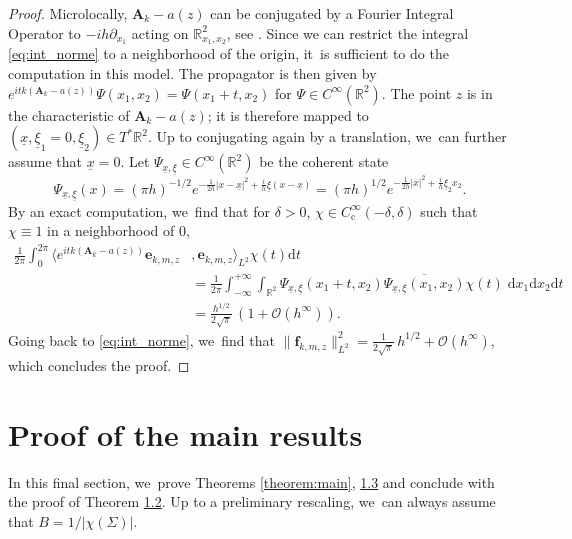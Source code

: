 \documentclass[10pt,a4paper]{amsart}
\newcommand{\bA}{\boldsymbol{A}}
\newcommand{\bme}{\boldsymbol{e}}
\newcommand{\bmf}{\boldsymbol{f}}
\theoremstyle{plain}
\theoremstyle{definition}
\let\con\overline
\let\mc\mathcal
\newcommand{\R}{\mathbb{R}}
\newcommand{\dd}{\mathrm{d}}
\DeclareMathOperator{\comp}{c}
\newcommand{\bigo}{\mathcal{O}}
\begin{document}
\begin{proof}
Microlocally, $\bA_k-a(z)$ can be conjugated by a
Fourier Integral Operator to $-ih\partial_{x_1}$ acting on
$\R^2_{x_1, x_2}$, see \cite[Th.\,12.3]{Zworski-12}. Since we can restrict the integral \eqref{eq:int_norme} to a
neighborhood of the origin, it~is sufficient to do the computation in this
model. The propagator is then given by $e^{itk(\bA_k-a(z))} \Psi (x_1, x_2) = \Psi (x_1 +t, x_2)$ for $\Psi \in C^\infty(\R^2)$. The point $z$ is in the characteristic of $\bA_k-a(z)$; it is therefore mapped to \hbox{$(\underline{x}, \underline{\xi}_1=0,\underline{\xi}_2) \in T^*\R^2$}. Up to conjugating again by a translation, we~can further assume that $\underline{x}=0$. Let
$\Psi_{\underline{x}, \underline{\xi}} \in C^\infty (\R^2)$ be
the coherent state
\[
\Psi_{\underline{x}, \underline{\xi}} (x) = (\pi h)^{-1/2} e^{ -
\frac{1}{2h} | x - \underline{x}|^2 + \frac{i}{h} \underline{\xi} (x - \underline{x}) } = (\pi h)^{1/2}e^{ -
\frac{1}{2h} | x|^2 + \frac{i}{h} \underline{\xi}_2 x_2 }.\]
By an exact computation, we~find that for $\delta > 0$, $\chi \in C^\infty_{{\comp}}(-\delta,\delta)$ such that $\chi \equiv 1$ in a neighborhood of $0$,
\[
\begin{split} \frac{1}{2 \pi } \int_0^{2 \pi } \langle e^{itk(\bA_k-a(z))} \bme_{k,m,z}&,\bme_{k,m,z} \rangle_{L^2} \chi(t)  \dd t \\
& = \frac{1}{2\pi} \int_{-\infty}^{+\infty} \int_{\R^2} \Psi _{ \underline{x},
\underline{\xi} } (x_1 + t, x_2) \con { \Psi_{ \underline{x}, \underline{\xi} } (x_1,
x_2)} \chi(t) \; \dd x_1 \dd x_2 \dd t \\
& = \frac{ h^{1/2}}{2 \sqrt \pi }\,(1+ \mc{O}(h^\infty)).
\end{split}
\]
Going back to \eqref{eq:int_norme}, we~find that $ \|\bmf_{k,m,z}\|^2_{L^2} =
\tfrac{1}{ 2 \sqrt \pi}\, h^{1/2} + \bigo (h^{\infty})$, which
concludes the proof.
\end{proof}

\section{Proof of the main results}

\label{section:proofs}

In this final section, we~prove Theorems \ref{theorem:main}, \href{https://jep.centre-mersenne.org/item/10.5802/jep.333.pdf#page=6}{1.3} and conclude with the proof of Theorem \href{https://jep.centre-mersenne.org/item/10.5802/jep.333.pdf#page=5}{1.2}. Up to a preliminary rescaling, we~can always assume that $B=1/|\chi(\Sigma)|$.
\end{document}
